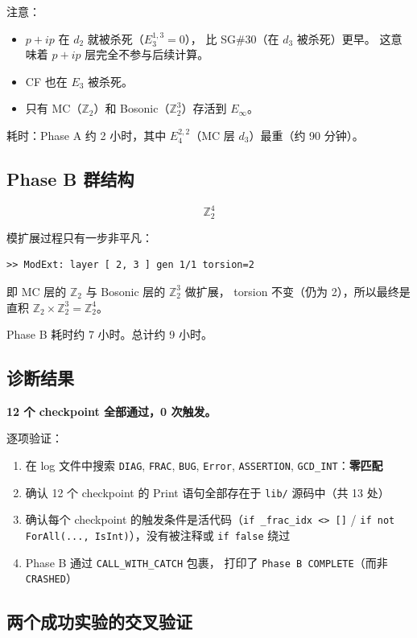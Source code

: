 \documentclass[a4paper,fontset=ubuntu,12pt]{ctexart}
\begin{document}
注意：
\begin{itemize}
\item $p{+}ip$ 在 $d_2$ 就被杀死（$E^{1,3}_3 = 0$），
      比 SG\#30（在 $d_3$ 被杀死）更早。
      这意味着 $p{+}ip$ 层完全不参与后续计算。
\item CF 也在 $E_3$ 被杀死。
\item 只有 MC（$\mathbb{Z}_2$）和 Bosonic（$\mathbb{Z}_2^3$）存活到 $E_\infty$。
\end{itemize}

耗时：Phase A 约 2 小时，其中 $E^{2,2}_4$（MC 层 $d_3$）最重（约 90 分钟）。

\subsection{Phase B 群结构}

\[
\boxed{\mathbb{Z}_2^4}
\]

模扩展过程只有一步非平凡：
\begin{verbatim}
>> ModExt: layer [ 2, 3 ] gen 1/1 torsion=2
\end{verbatim}
即 MC 层的 $\mathbb{Z}_2$ 与 Bosonic 层的 $\mathbb{Z}_2^3$ 做扩展，
torsion 不变（仍为 2），所以最终是直积 $\mathbb{Z}_2 \times \mathbb{Z}_2^3 = \mathbb{Z}_2^4$。

Phase B 耗时约 7 小时。总计约 9 小时。

\subsection{诊断结果}

\textbf{12 个 checkpoint 全部通过，0 次触发。}

逐项验证：
\begin{enumerate}
\item 在 log 文件中搜索 \texttt{DIAG}, \texttt{FRAC}, \texttt{BUG}, \texttt{Error},
      \texttt{ASSERTION}, \texttt{GCD\_INT}：\textbf{零匹配}
\item 确认 12 个 checkpoint 的 Print 语句全部存在于 \texttt{lib/} 源码中（共 13 处）
\item 确认每个 checkpoint 的触发条件是活代码（\texttt{if \_frac\_idx <> []}
      / \texttt{if not ForAll(..., IsInt)}），没有被注释或 \texttt{if false} 绕过
\item Phase B 通过 \texttt{CALL\_WITH\_CATCH} 包裹，
      打印了 \texttt{Phase B COMPLETE}（而非 \texttt{CRASHED}）
\end{enumerate}

\subsection{两个成功实验的交叉验证}
\end{document}
